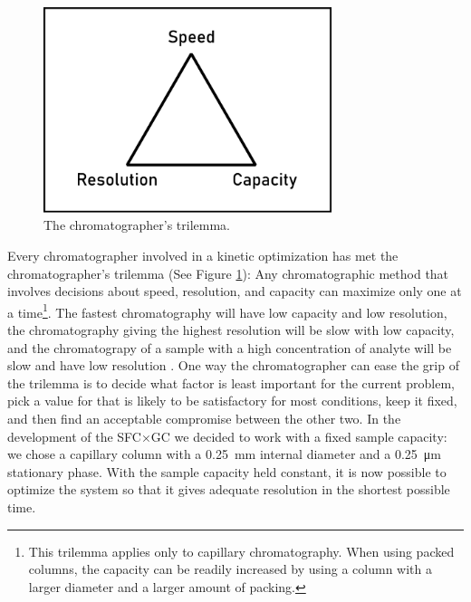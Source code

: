 \begin{figure}
\centering
\includegraphics[width=0.75\textwidth]{Figures/Triangle.pdf}
\decoRule
\caption[Schematic diagram of a the chromatographer's trilemma.]{The chromatographer's trilemma.}
\label{fig:trilemma}
\end{figure}


Every chromatographer involved in a kinetic optimization has met the
chromatographer's trilemma (See Figure \ref{fig:trilemma}): Any chromatographic
method that involves decisions about speed, resolution, and capacity can
maximize only one at a time\footnote{This trilemma applies only to capillary
chromatography. When using packed columns, the capacity can be readily increased
by using a column with a larger diameter and a larger amount of packing.}. The
fastest chromatography will have low capacity and low resolution, the
chromatography giving the highest resolution will be slow with low capacity, and
the chromatograpy of a sample with a high concentration of analyte will be slow
and have low resolution \autocite{Klee2002}. One way the chromatographer can
ease the grip of the trilemma is to decide what factor is least important for
the current problem, pick a value for that is likely to be satisfactory for most
conditions, keep it fixed, and then find an acceptable compromise between the
other two. In the development of the SFC×GC we decided to work with a fixed
sample capacity: we chose a capillary column with a \SI{0.25}{\milli\metre}
internal diameter and a \SI{0.25}{\micro\metre} stationary phase. With the
sample capacity held constant, it is now possible to optimize the system so that
it gives adequate resolution in the shortest possible time.

